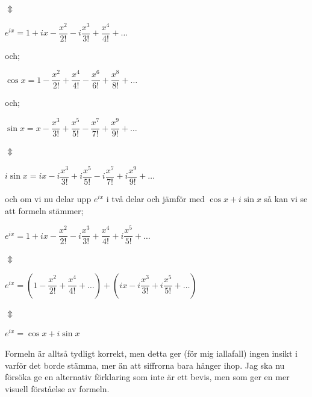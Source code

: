 \documentclass[10pt, a4paper]{amsart}
\begin{document}
\hspace{10ex}
$ \Updownarrow $
\bigskip

\hspace{5ex}
$ e^{ix} = 1 + ix - \dfrac{x^2}{2!} - i\dfrac{x^3}{3!} + \dfrac{x^4}{4!} + \dotso $
\vspace{24pt plus 4pt minus 4pt} 

och;
\bigskip

\bigskip
\hspace{5ex}
$ \cos x = 1 - \dfrac{x^2}{2!} + \dfrac{x^4}{4!} - \dfrac{x^6}{6!} + \dfrac{x^8}{8!} + \dotso $
\bigskip

och;
\vspace{24pt plus 4pt minus 4pt} 

\hspace{5ex}
$ \sin x = x - \dfrac{x^3}{3!} + \dfrac{x^5}{5!} - \dfrac{x^7}{7!} + \dfrac{x^9}{9!} + \dotso $
\bigskip

\hspace{10ex}
$ \Updownarrow $
\bigskip

\hspace{5ex}
$ i\sin x = ix - i\dfrac{x^3}{3!} + i\dfrac{x^5}{5!} - i\dfrac{x^7}{7!} + i\dfrac{x^9}{9!} + \dotso $
\bigskip
\bigskip

och om vi nu delar upp $ e^{ix} $ i två delar och jämför med $ \cos x + i\sin x $ så kan vi se att formeln stämmer;
\bigskip

\bigskip
\hspace{5ex}
$ e^{ix} = 1 + ix - \dfrac{x^2}{2!} - i\dfrac{x^3}{3!} + \dfrac{x^4}{4!} + i\dfrac{x^5}{5!} + \dotso $
\bigskip

\hspace{10ex}
$ \Updownarrow $
\bigskip

\hspace{5ex}
$ e^{ix} = \left(1 - \dfrac{x^2}{2!} + \dfrac{x^4}{4!} + \dotso\right) + \left(ix - i\dfrac{x^3}{3!} + i\dfrac{x^5}{5!} + \dotso\right) $
\bigskip

\hspace{10ex}
$ \Updownarrow $
\bigskip

\hspace{5ex}
$ e^{ix} = \cos x + i\sin x $
\bigskip
\bigskip

Formeln är alltså tydligt korrekt, men detta ger (för mig iallafall) ingen insikt i varför det borde stämma, mer än att siffrorna bara hänger ihop.
Jag ska nu försöka ge en alternativ förklaring som inte är ett bevis, men som ger en mer visuell förståelse av formeln.
\bigskip
\end{document}
